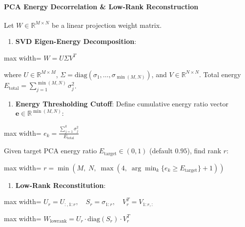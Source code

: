 \paragraph{PCA Energy Decorrelation \& Low-Rank Reconstruction}

Let $W \in \mathbb{R}^{M \times N}$ be a linear projection weight matrix.

\begin{enumerate}
\item \textbf{SVD Eigen-Energy Decomposition}:
\end{enumerate}
\begin{center}
\begin{adjustbox}{max width=\columnwidth}
$\displaystyle
W = U \Sigma V^T
$
\end{adjustbox}
\end{center}
where $U \in \mathbb{R}^{M \times M}$, $\Sigma = \text{diag}(\sigma_1, \dots, \sigma_{\min(M, N)})$, and $V \in \mathbb{R}^{N \times N}$.
Total energy $E_{\text{total}} = \sum_{j=1}^{\min(M, N)} \sigma_j^2$.

\begin{enumerate}
\item \textbf{Energy Thresholding Cutoff}:
Define cumulative energy ratio vector $\mathbf{e} \in \mathbb{R}^{\min(M, N)}$:
\end{enumerate}
\begin{center}
\begin{adjustbox}{max width=\columnwidth}
$\displaystyle
e_k = \frac{\sum_{j=1}^k \sigma_j^2}{E_{\text{total}}}
$
\end{adjustbox}
\end{center}
Given target PCA energy ratio $E_{\text{target}} \in (0, 1)$ (default $0.95$), find rank $r$:
\begin{center}
\begin{adjustbox}{max width=\columnwidth}
$\displaystyle
r = \min\left( M, \; N, \; \max\left( 4, \; \arg\min_k \{ e_k \ge E_{\text{target}} \} + 1 \right) \right)
$
\end{adjustbox}
\end{center}

\begin{enumerate}
\item \textbf{Low-Rank Reconstitution}:
\end{enumerate}
\begin{center}
\begin{adjustbox}{max width=\columnwidth}
$\displaystyle
U_r = U_{:, 1:r}, \quad S_r = \sigma_{1:r}, \quad V_r^T = V_{1:r, :}
$
\end{adjustbox}
\end{center}
\begin{center}
\begin{adjustbox}{max width=\columnwidth}
$\displaystyle
W_{\text{lowrank}} = U_r \cdot \text{diag}(S_r) \cdot V_r^T
$
\end{adjustbox}
\end{center}

